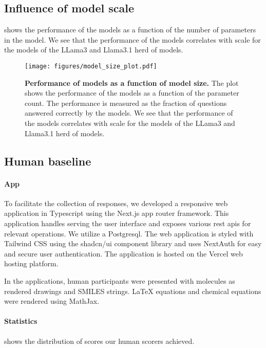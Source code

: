 \subsection{Influence of model scale}
 shows the performance of the models as a function of the number of parameters in the model.
We see that the performance of the models correlates with scale for the models of the LLama3 and Llama3.1 herd of models.

\begin{figure}
    \centering
    \texttt{[image: figures/model\_size\_plot.pdf]}
    \caption{\textbf{Performance of models as a function of model size.} The plot shows the performance of the models as a function of the parameter count. The performance is measured as the fraction of questions answered correctly by the models. We see that the performance of the models correlates with scale for the models of the LLama3 and Llama3.1 herd of models.}
    \label{fig:model_size_plot}
\end{figure}

\subsection{Human baseline}
\paragraph{App} To facilitate the collection of responses, we developed a responsive web application in Typescript using the Next.js\autocite{nextjs} app router framework.
This application handles serving the user interface and exposes various \gls{rest} \glspl{api} for relevant operations.
We utilize a Postgresql.
The web application is styled with Tailwind CSS\autocite{tailwindcss} using the shadcn/ui component library and uses NextAuth\autocite{nextauth} for easy and secure user authentication.
The application is hosted on the Vercel web hosting platform.

In the applications, human participants were presented with molecules as rendered drawings and SMILES strings. \LaTeX\xspace equations and chemical equations were rendered using MathJax\autocite{mathjax}.


\paragraph{Statistics}
 shows the distribution of scores our human scorers achieved.

